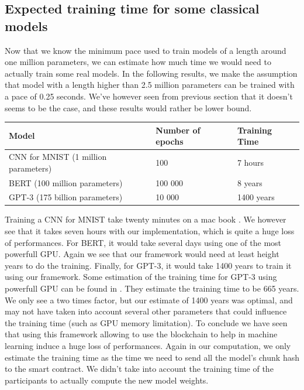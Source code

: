 \documentclass{article}
\begin{document}
\subsection{Expected training time for some classical models}
Now that we know the minimum pace used to train models of a length around one million parameters, we can estimate
how much time we would need to actually train some real models. In the following results, we make the
assumption that model with a length higher than 2.5 million parameters can be trained with a pace of 0.25 seconds. We've
however seen from previous section that it doesn't seems to be the case, and these results would rather be lower bound.
\begin{longtable}{|l|l|l|}
    \hline
    Model                                & Number of epochs & Training Time \\ \hline
    \endfirsthead
    \endhead
    CNN for MNIST (1 million parameters) & 100              & 7 hours       \\ \hline
    BERT (100 million parameters)        & 100 000          & 8 years       \\ \hline
    GPT-3 (175 billion parameters)       & 10 000           & 1400 years    \\ \hline
\end{longtable}
Training a CNN for MNIST take twenty minutes\cite{MNIST_runtime} on a mac book . We however see that it takes seven hours
with our implementation, which is quite a huge loss of performances. For BERT, it would take several days \cite{BERT_runtime} using one of the
most powerfull GPU. Again we see that our framework would need at least height years to do the training. Finally, for GPT-3,
it would take 1400 years to train it using our framework. Some estimation of the training time for GPT-3 using powerfull
GPU can be found in \cite{GPT_runtime}. They estimate the training time to be 665 years. We only see a two times
factor, but our estimate of 1400 years was optimal, and may not have taken into account several other parameters that could influence
the training time (such as GPU memory limitation). To conclude we have seen that using this framework allowing to use the
blockchain to help in machine learning induce a huge loss of performances. Again in our computation, we only estimate the
training time as the time we need to send all the model's chunk hash to the smart contract. We didn't take into account
the training time of the participants to actually compute the new model weights.
\end{document}
